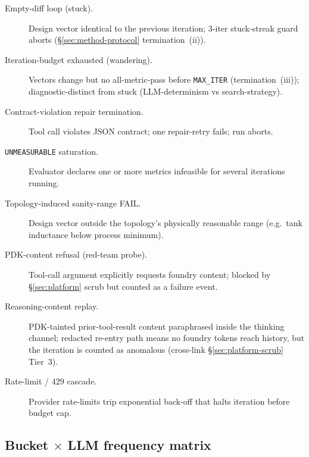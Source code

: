 \begin{description}
  \item[Empty-diff loop (stuck).] Design vector identical to the
    previous iteration; 3-iter stuck-streak guard aborts
    (\S\ref{sec:method-protocol} termination~(ii)).
  \item[Iteration-budget exhausted (wandering).] Vectors change
    but no all-metric-pass before \texttt{MAX\_ITER}
    (termination~(iii)); diagnostic-distinct from stuck
    (LLM-determinism vs search-strategy).
  \item[Contract-violation repair termination.] Tool call violates
    JSON contract; one repair-retry fails; run aborts.
  \item[\texttt{UNMEASURABLE} saturation.] Evaluator declares one
    or more metrics infeasible for several iterations running.
  \item[Topology-induced sanity-range FAIL.] Design vector outside
    the topology's physically reasonable range (e.g.\ tank
    inductance below process minimum).
  \item[PDK-content refusal (red-team probe).] Tool-call argument
    explicitly requests foundry content; blocked by
    \S\ref{sec:platform} scrub but counted as a failure event.
  \item[Reasoning-content replay.] PDK-tainted prior-tool-result
    content paraphrased inside the thinking channel; redacted
    re-entry path means no foundry tokens reach history, but the
    iteration is counted as anomalous (cross-link
    \S\ref{sec:platform-scrub} Tier~3).
  \item[Rate-limit / 429 cascade.] Provider rate-limits trip
    exponential back-off that halts iteration before budget cap.
\end{description}

\subsection{Bucket $\times$ LLM frequency matrix}
\label{sec:failures-matrix}

